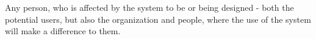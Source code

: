 \begin{definition}[Stakeholder] \label{def:stakeholder} 
  Any person, who is affected by the system to be or being designed - both
  the potential users, but also the organization and people, where the use of
  the system will make a difference to them.
  \cite[p. 50]{benyon14}
\end{definition}
